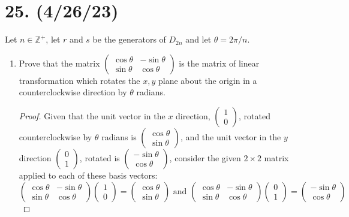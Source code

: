 \documentclass{article}
\begin{document}
\section*{25. (4/26/23)}

Let $n \in \mathbb{Z}^+$, let $r$ and $s$ be the generators of $D_{2n}$ and let $\theta = 2\pi / n$.

\begin{enumerate}[label=(\alph*)]
    \item Prove that the matrix $\begin{pmatrix}\cos \theta & -\sin \theta\\\sin \theta & \cos \theta\end{pmatrix}$ is the matrix of linear transformation which rotates the $x, y$ plane about the origin in a counterclockwise direction by $\theta$ radians.
          \begin{proof}
            Given that the unit vector in the $x$ direction, $\begin{pmatrix}1 \\ 0\end{pmatrix}$, rotated counterclockwise by $\theta$ radians is $\begin{pmatrix}\cos \theta \\ \sin \theta\end{pmatrix}$, and the unit vector in the $y$ direction $\begin{pmatrix}0 \\ 1\end{pmatrix}$, rotated is $\begin{pmatrix}-\sin \theta \\ \cos \theta\end{pmatrix}$, consider the given $2 \times 2$ matrix applied to each of these basis vectors:
            \begin{equation*}
                \begin{pmatrix}\cos \theta & -\sin \theta\\\sin \theta & \cos \theta\end{pmatrix}\begin{pmatrix}1 \\ 0\end{pmatrix} = \begin{pmatrix}\cos \theta \\ \sin \theta\end{pmatrix} \text{ and } \begin{pmatrix}\cos \theta & -\sin \theta\\\sin \theta & \cos \theta\end{pmatrix}\begin{pmatrix}0 \\ 1\end{pmatrix} = \begin{pmatrix}-\sin \theta \\ \cos \theta\end{pmatrix}

\end{equation*}
\end{proof}
\end{enumerate}
\end{document}
